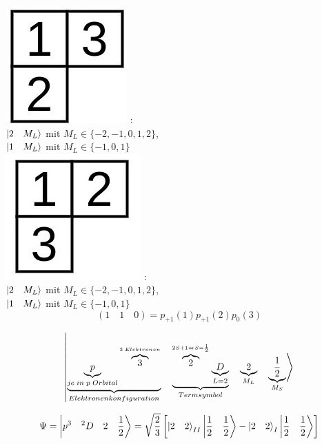 \documentclass[12pt,a4paper]{article}
\begin{document}
\includegraphics[scale=0.6]{build/young-13.jpg} : \\
$\ket{ 2\quad  M_L} $ mit $M_L \in \{-2, -1, 0, 1, 2\}$,\\
$\ket{ 1\quad  M_L} $ mit $M_L \in \{-1, 0, 1\}$\\

\includegraphics[scale=0.6]{build/young-12.jpg} : \\
$\ket{ 2\quad  M_L} $ mit $M_L \in \{-2, -1, 0, 1, 2\}$,\\
$\ket{ 1\quad  M_L} $ mit $M_L \in \{-1, 0, 1\}$\\


$$ \left( 1\quad 1 \quad 0\right) = p_{+1}(1) p_{+1}(2) p_{0}(3)$$


$$\ket{ 
\underbrace{
\underbrace{p}_{je\;in\;p\;Orbital}{}^{\overbrace{3}^{3\;Elektronen}} 
}_{Elektronenkonfiguration}
\quad 
\underbrace{{}^{\overbrace{2}^{2S + 1 \Leftrightarrow S = \frac{1}{2}}}\underbrace{D}_{L = 2} }_{Termsymbol}
\quad \underbrace{2}_{M_L} \quad 
\underbrace{\frac{1}{2}}_{M_S}
}$$

$$\Psi = \ket{p^{3} \quad{}^{2}D \quad 2 \quad\frac{1}{2}}
 = \sqrt{\frac{2}{3}} \left[ \ket{2\quad 2}_{II} \ket{\frac{1}{2} \quad\frac{1}{2}} - \ket{2\quad 2}_I \ket{\frac{1}{2}\quad\frac{1}{2}} \right]
$$
\end{document}
